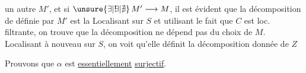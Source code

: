 
un autre $M'$, et si $\unsure{\exists|{\rlap{\text{!}}\exists}|\nexists}\,M'\longrightarrow M$,  il est évident que la décomposition de  définie par $M'$ est la  Localisant sur $S$ et utilisant le fait que $C$ est loc. filtrante, on trouve que la décomposition ne dépend pas du choix de $M$. Localisant à nouveau sur $S$, on voit qu'elle définit la décomposition donnée de $Z$

Prouvons que $\alpha$ est \uline{essentiellement} \uline{surjectif}.

